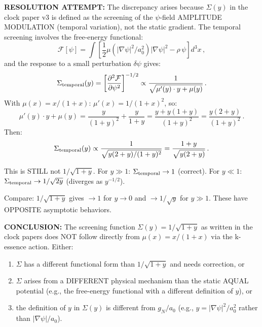 \documentclass[11pt]{article}
\newcommand{\aM}{a_0}
\begin{document}
\begin{tcolorbox}[colback=blue!5!white, colframe=blue!70!black,
  title=\textbf{W4i23 TOP 5 FINDINGS --- PATENT TEAM}]
\begin{enumerate}
  \textbf{RESOLUTION ATTEMPT:}  The discrepancy arises because
  $\Sigma(y)$ in the clock paper v3 is defined as the screening of the
  $\psi$-field AMPLITUDE MODULATION (temporal variation), not the static
  gradient.  The temporal screening involves the free-energy functional:
  \begin{equation}
  \mathcal{F}[\psi] = \int\left[\frac{1}{2}\mu(|\nabla\psi|^2/\aM^2)
  |\nabla\psi|^2 - \rho\,\psi\right]d^3x\,,
  \end{equation}
  and the response to a small perturbation $\delta\psi$ gives:
  \begin{equation}
  \Sigma_{\rm temporal}(y)
  = \left[\frac{\partial^2\mathcal{F}}{\partial\psi^2}\right]^{-1/2}
  \propto \frac{1}{\sqrt{\mu'(y)\cdot y + \mu(y)}}\,.
  \end{equation}
  With $\mu(x) = x/(1+x)$: $\mu'(x) = 1/(1+x)^2$, so:
  \begin{equation}
  \mu'(y)\cdot y + \mu(y) = \frac{y}{(1+y)^2} + \frac{y}{1+y}
  = \frac{y + y(1+y)}{(1+y)^2} = \frac{y(2+y)}{(1+y)^2}\,.
  \end{equation}
  Then:
  \begin{equation}
  \Sigma_{\rm temporal}(y) \propto \frac{1}{\sqrt{y(2+y)/(1+y)^2}}
  = \frac{1+y}{\sqrt{y(2+y)}}\,.
  \end{equation}

  This is STILL not $1/\sqrt{1+y}$.  For $y \gg 1$:
  $\Sigma_{\rm temporal} \to 1$ (correct).
  For $y \ll 1$: $\Sigma_{\rm temporal} \to 1/\sqrt{2y}$ (diverges
  as $y^{-1/2}$).

  Compare: $1/\sqrt{1+y}$ gives $\to 1$ for $y \to 0$ and
  $\to 1/\sqrt{y}$ for $y \gg 1$.  These have OPPOSITE asymptotic
  behaviors.

  \textbf{CONCLUSION:}  The screening function $\Sigma(y) = 1/\sqrt{1+y}$
  as written in the clock papers does NOT follow directly from
  $\mu(x) = x/(1+x)$ via the k-essence action.  Either:
  \begin{enumerate}[label=(\alph*)]
  \item $\Sigma$ has a different functional form than $1/\sqrt{1+y}$
    and needs correction, or
  \item $\Sigma$ arises from a DIFFERENT physical mechanism than the
    static AQUAL potential (e.g., the free-energy functional with
    a different definition of $y$), or
  \item the definition of $y$ in $\Sigma(y)$ is different from
    $g_N/\aM$ (e.g., $y = |\nabla\psi|^2/\aM^2$ rather than
    $|\nabla\psi|/\aM$).
  \end{enumerate}


\end{enumerate}
\end{tcolorbox}
\end{document}
